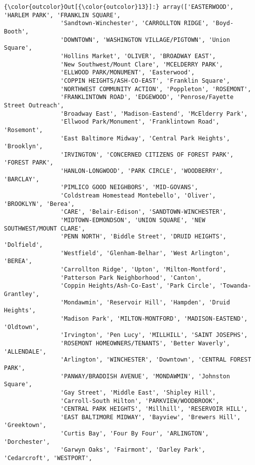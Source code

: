 \documentclass[11pt]{article}
\begin{document}
\begin{Verbatim}[commandchars=\\\{\}]
{\color{outcolor}Out[{\color{outcolor}13}]:} array(['EASTERWOOD', 'HARLEM PARK', 'FRANKLIN SQUARE',
                'Sandtown-Winchester', 'CARROLLTON RIDGE', 'Boyd-Booth',
                'DOWNTOWN', 'WASHINGTON VILLAGE/PIGTOWN', 'Union Square',
                'Hollins Market', 'OLIVER', 'BROADWAY EAST',
                'New Southwest/Mount Clare', 'MCELDERRY PARK',
                'ELLWOOD PARK/MONUMENT', 'Easterwood',
                'COPPIN HEIGHTS/ASH-CO-EAST', 'Franklin Square',
                'NORTHWEST COMMUNITY ACTION', 'Poppleton', 'ROSEMONT',
                'FRANKLINTOWN ROAD', 'EDGEWOOD', 'Penrose/Fayette Street Outreach',
                'Broadway East', 'Madison-Eastend', 'McElderry Park',
                'Ellwood Park/Monument', 'Franklintown Road', 'Rosemont',
                'East Baltimore Midway', 'Central Park Heights', 'Brooklyn',
                'IRVINGTON', 'CONCERNED CITIZENS OF FOREST PARK', 'FOREST PARK',
                'HANLON-LONGWOOD', 'PARK CIRCLE', 'WOODBERRY', 'BARCLAY',
                'PIMLICO GOOD NEIGHBORS', 'MID-GOVANS',
                'Coldstream Homestead Montebello', 'Oliver', 'BROOKLYN', 'Berea',
                'CARE', 'Belair-Edison', 'SANDTOWN-WINCHESTER',
                'MIDTOWN-EDMONDSON', 'UNION SQUARE', 'NEW SOUTHWEST/MOUNT CLARE',
                'PENN NORTH', 'Biddle Street', 'DRUID HEIGHTS', 'Dolfield',
                'Westfield', 'Glenham-Belhar', 'West Arlington', 'BEREA',
                'Carrollton Ridge', 'Upton', 'Milton-Montford',
                'Patterson Park Neighborhood', 'Canton',
                'Coppin Heights/Ash-Co-East', 'Park Circle', 'Towanda-Grantley',
                'Mondawmin', 'Reservoir Hill', 'Hampden', 'Druid Heights',
                'Madison Park', 'MILTON-MONTFORD', 'MADISON-EASTEND', 'Oldtown',
                'Irvington', 'Pen Lucy', 'MILLHILL', 'SAINT JOSEPHS',
                'ROSEMONT HOMEOWNERS/TENANTS', 'Better Waverly', 'ALLENDALE',
                'Arlington', 'WINCHESTER', 'Downtown', 'CENTRAL FOREST PARK',
                'PANWAY/BRADDISH AVENUE', 'MONDAWMIN', 'Johnston Square',
                'Gay Street', 'Middle East', 'Shipley Hill',
                'Carroll-South Hilton', 'PARKVIEW/WOODBROOK',
                'CENTRAL PARK HEIGHTS', 'Millhill', 'RESERVOIR HILL',
                'EAST BALTIMORE MIDWAY', 'Bayview', 'Brewers Hill', 'Greektown',
                'Curtis Bay', 'Four By Four', 'ARLINGTON', 'Dorchester',
                'Garwyn Oaks', 'Fairmont', 'Darley Park', 'Cedarcroft', 'WESTPORT',

\end{Verbatim}
\end{document}
